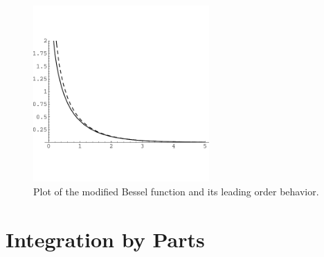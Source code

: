 \begin{Example}
  \begin{figure}[h!]
    \begin{center}
      \includegraphics[width=0.6\textwidth]{ode/asymptotic/besselk0}
    \end{center}
    \caption{Plot of the modified Bessel function and its leading order 
      behavior.}
    \label{besselk0}
  \end{figure}

\end{Example}





















\section{Integration by Parts}

